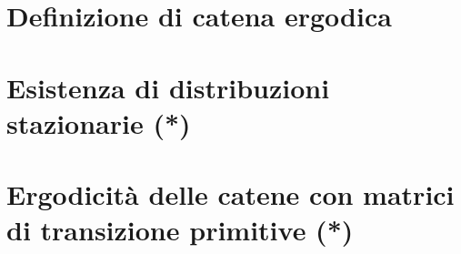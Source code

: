 \documentclass[\main/main.tex]{subfiles}
\begin{document}
\section{Definizione di catena ergodica}
\section{Esistenza di distribuzioni stazionarie (*)}
\section{Ergodicità delle catene con matrici di transizione primitive (*)}
\end{document}

